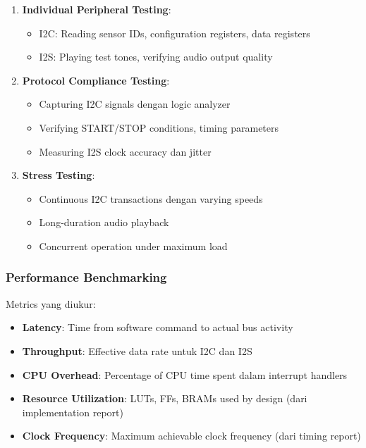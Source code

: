 \begin{enumerate}
	\item \textbf{Individual Peripheral Testing}:
	\begin{itemize}
		\item I2C: Reading sensor IDs, configuration registers, data registers
		\item I2S: Playing test tones, verifying audio output quality
	\end{itemize}
	
	\item \textbf{Protocol Compliance Testing}:
	\begin{itemize}
		\item Capturing I2C signals dengan logic analyzer
		\item Verifying START/STOP conditions, timing parameters
		\item Measuring I2S clock accuracy dan jitter
	\end{itemize}
	
	\item \textbf{Stress Testing}:
	\begin{itemize}
		\item Continuous I2C transactions dengan varying speeds
		\item Long-duration audio playback
		\item Concurrent operation under maximum load
	\end{itemize}
\end{enumerate}

\subsubsection{Performance Benchmarking}

Metrics yang diukur:
\begin{itemize}
	\item \textbf{Latency}: Time from software command to actual bus activity
	\item \textbf{Throughput}: Effective data rate untuk I2C dan I2S
	\item \textbf{CPU Overhead}: Percentage of CPU time spent dalam interrupt handlers
	\item \textbf{Resource Utilization}: LUTs, FFs, BRAMs used by design (dari implementation report)
	\item \textbf{Clock Frequency}: Maximum achievable clock frequency (dari timing report)
\end{itemize}

